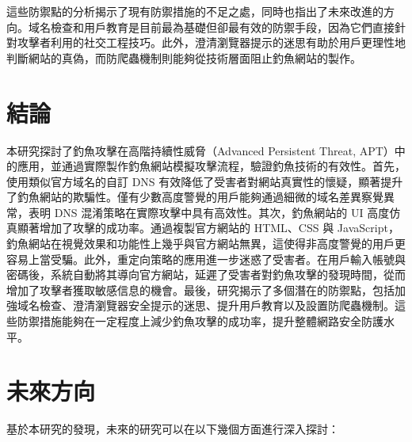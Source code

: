 \documentclass[a4paper,12pt]{article}
\begin{document}
這些防禦點的分析揭示了現有防禦措施的不足之處，同時也指出了未來改進的方向。域名檢查和用戶教育是目前最為基礎但卻最有效的防禦手段，因為它們直接針對攻擊者利用的社交工程技巧。此外，澄清瀏覽器提示的迷思有助於用戶更理性地判斷網站的真偽，而防爬蟲機制則能夠從技術層面阻止釣魚網站的製作。


\section{結論}
本研究探討了釣魚攻擊在高階持續性威脅（Advanced Persistent Threat, APT）中的應用，並通過實際製作釣魚網站模擬攻擊流程，驗證釣魚技術的有效性。首先，使用類似官方域名的自訂 DNS 有效降低了受害者對網站真實性的懷疑，顯著提升了釣魚網站的欺騙性。僅有少數高度警覺的用戶能夠通過細微的域名差異察覺異常，表明 DNS 混淆策略在實際攻擊中具有高效性。其次，釣魚網站的 UI 高度仿真顯著增加了攻擊的成功率。通過複製官方網站的 HTML、CSS 與 JavaScript，釣魚網站在視覺效果和功能性上幾乎與官方網站無異，這使得非高度警覺的用戶更容易上當受騙。此外，重定向策略的應用進一步迷惑了受害者。在用戶輸入帳號與密碼後，系統自動將其導向官方網站，延遲了受害者對釣魚攻擊的發現時間，從而增加了攻擊者獲取敏感信息的機會。最後，研究揭示了多個潛在的防禦點，包括加強域名檢查、澄清瀏覽器安全提示的迷思、提升用戶教育以及設置防爬蟲機制。這些防禦措施能夠在一定程度上減少釣魚攻擊的成功率，提升整體網路安全防護水平。

\section{未來方向}
基於本研究的發現，未來的研究可以在以下幾個方面進行深入探討：
\end{document}
